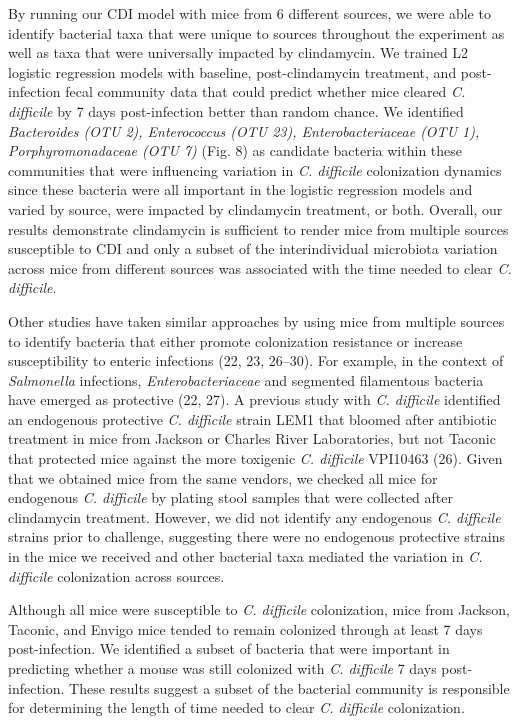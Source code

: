 \documentclass[11pt,]{article}
\begin{document}
By running our CDI model with mice from 6 different sources, we were
able to identify bacterial taxa that were unique to sources throughout
the experiment as well as taxa that were universally impacted by
clindamycin. We trained L2 logistic regression models with baseline,
post-clindamycin treatment, and post-infection fecal community data that
could predict whether mice cleared \emph{C. difficile} by 7 days
post-infection better than random chance. We identified
\emph{Bacteroides (OTU 2), Enterococcus (OTU 23), Enterobacteriaceae
(OTU 1), Porphyromonadaceae (OTU 7)} (Fig. 8) as candidate bacteria
within these communities that were influencing variation in \emph{C.
difficile} colonization dynamics since these bacteria were all important
in the logistic regression models and varied by source, were impacted by
clindamycin treatment, or both. Overall, our results demonstrate
clindamycin is sufficient to render mice from multiple sources
susceptible to CDI and only a subset of the interindividual microbiota
variation across mice from different sources was associated with the
time needed to clear \emph{C. difficile}.

Other studies have taken similar approaches by using mice from multiple
sources to identify bacteria that either promote colonization resistance
or increase susceptibility to enteric infections (22, 23, 26--30). For
example, in the context of \emph{Salmonella} infections,
\emph{Enterobacteriaceae} and segmented filamentous bacteria have
emerged as protective (22, 27). A previous study with \emph{C.
difficile} identified an endogenous protective \emph{C. difficile}
strain LEM1 that bloomed after antibiotic treatment in mice from Jackson
or Charles River Laboratories, but not Taconic that protected mice
against the more toxigenic \emph{C. difficile} VPI10463 (26). Given that
we obtained mice from the same vendors, we checked all mice for
endogenous \emph{C. difficile} by plating stool samples that were
collected after clindamycin treatment. However, we did not identify any
endogenous \emph{C. difficile} strains prior to challenge, suggesting
there were no endogenous protective strains in the mice we received and
other bacterial taxa mediated the variation in \emph{C. difficile}
colonization across sources.

Although all mice were susceptible to \emph{C. difficile} colonization,
mice from Jackson, Taconic, and Envigo mice tended to remain colonized
through at least 7 days post-infection. We identified a subset of
bacteria that were important in predicting whether a mouse was still
colonized with \emph{C. difficile} 7 days post-infection. These results
suggest a subset of the bacterial community is responsible for
determining the length of time needed to clear \emph{C. difficile}
colonization.
\end{document}
